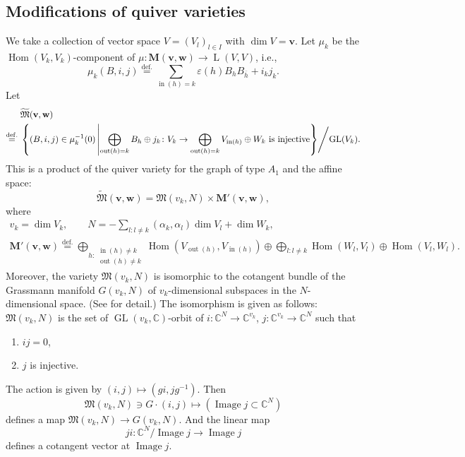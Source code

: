 \documentclass[12pt]{amsart}
\def\Bbb{\mathbb}
\def\frak{\mathfrak}
\renewcommand{\labelenumi}{(\theenumi)}%
\newenvironment{aenume}{%
  \begin{enumerate}%
  \renewcommand{\theenumi}{\alph{enumi}}%
  \renewcommand{\labelenumi}{(\theenumi)}%
  }{\end{enumerate}}
\theoremstyle{definition}
\theoremstyle{remark}
\numberwithin{equation}{subsection}
\newcommand{\defeq}{\overset{\operatorname{\scriptstyle def.}}{=}}
\newcommand{\C}{{\Bbb C}}
\newcommand{\GL}{\operatorname{GL}}
\newcommand{\Hom}{\operatorname{Hom}}
\newcommand{\vin}{\operatorname{in}} %
\newcommand{\vout}{\operatorname{out}} %
\newcommand{\bM}{{\mathbf M}} %
\newcommand{\M}{{\frak M}} %
\newcommand{\bv}{{\mathbf v}} %
\newcommand{\bw}{{\mathbf w}} %
\newcommand{\HomL}{\operatorname{L}}
\newcommand{\Mp}{\widetilde\M}
\begin{document}
\subsection{Modifications of quiver varieties}\label{subsec:modQui}
We take a collection of vector space 
$V = (V_l)_{l\in I}$ with $\dim V = \bv$.
Let $\mu_k$ be the $\Hom(V_k,V_k)$-component of
$\mu\colon \bM(\bv,\bw)\to \HomL(V,V)$, i.e.,
\begin{equation*}
  \mu_k(B,i,j) \defeq
  \sum_{\vin(h)=k} \varepsilon(h) B_h B_{\overline h} + i_k j_k.
\end{equation*}
Let
\begin{equation*}
\begin{split}
  & \Mp(\bv,\bw) \\
 \defeq \; &\left\{ (B,i,j)\in \mu_k^{-1}(0) \left|
   \text{$\bigoplus_{\vout(h)=k} B_h \oplus j_k\colon
   V_k \to \bigoplus_{\vout(h)=k} V_{\vin(h)}\oplus W_k$ is injective}
   \right\}\right/\! \GL(V_k).
\end{split}
\end{equation*}
This is a product of the quiver variety for the graph of type $A_1$
and the affine space:
\begin{equation*}
  \Mp(\bv,\bw) = \M(v_k,N) \times \bM'(\bv,\bw),
\end{equation*}
where
\begin{gather*}
  v_k = \dim V_k, \qquad 
  N = - \sum_{l:l\neq k} (\alpha_k,\alpha_l)\dim V_l+\dim W_k, \\
%
  \bM'(\bv,\bw) \defeq
  \bigoplus_{h\colon \substack{\vin(h)\neq k\\ \vout(h)\neq k}}
  \Hom(V_{\vout(h)}, V_{\vin(h)}) \oplus
  \bigoplus_{l\colon l\neq k} \Hom(W_l, V_l)\oplus \Hom(V_l,W_l).
\end{gather*}
Moreover, the variety $\M(v_k,N)$ is isomorphic to the cotangent
bundle of the Grassmann manifold $G(v_k,N)$ of $v_k$-dimensional
subspaces in the $N$-dimensional space. (See \cite[Chap.~7]{Na-quiver}
for detail.)
%
The isomorphism is given as follows: $\M(v_k,N)$ is the set of
$\GL(v_k,\C)$-orbit of $i\colon\C^N \to \C^{v_k}$, $j\colon
\C^{v_k}\to \C^N$ such that
\begin{aenume}
\item $ij = 0$,
\item $j$ is injective.
\end{aenume}
The action is given by $(i,j)\mapsto (gi, jg^{-1})$. Then
\begin{equation*}
  \M(v_k,N)\ni G\cdot (i,j) \mapsto
  (\operatorname{Image}j\subset\C^N)
\end{equation*}
defines a map $\M(v_k,N)\to G(v_k,N)$. And the linear map
\begin{equation*}
   ji\colon \C^N/\operatorname{Image}j \longrightarrow
   \operatorname{Image}j 
\end{equation*}
defines a cotangent vector at $\operatorname{Image}j$.
\end{document}
